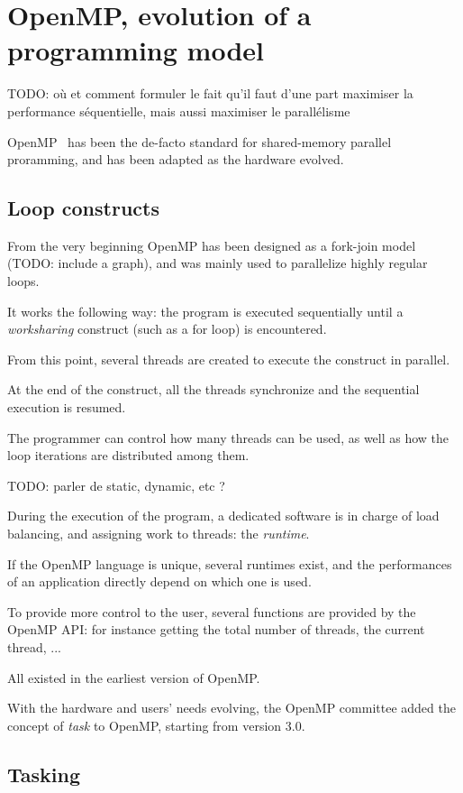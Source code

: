 \section{OpenMP, evolution of a programming model}\label{sec:context:openmp}

TODO: où et comment formuler le fait qu'il faut d'une part maximiser la performance séquentielle, mais aussi maximiser le parallélisme

OpenMP~\cite{openmp40} has been the de-facto standard for shared-memory parallel proramming, and has been adapted as the hardware evolved.

\subsection{Loop constructs}

From the very beginning OpenMP has been designed as a fork-join model (TODO: include a graph), and was mainly used to parallelize highly regular loops.

It works the following way: the program is executed sequentially until a \emph{worksharing} construct (such as a for loop) is encountered.

From this point, several threads are created to execute the construct in parallel.

At the end of the construct, all the threads synchronize and the sequential execution is resumed.

The programmer can control how many threads can be used, as well as how the loop iterations are distributed among them.

TODO: parler de static, dynamic, etc ?

During the execution of the program, a dedicated software is in charge of load balancing, and assigning work to threads: the \emph{runtime}.

If the OpenMP language is unique, several runtimes exist, and the performances of an application directly depend on which one is used.


To provide more control to the user, several functions are provided by the OpenMP API: for instance getting the total number of threads, the current thread, ...

All existed in the earliest version of OpenMP.

With the hardware and users' needs evolving, the OpenMP committee added the concept of \emph{task} to OpenMP, starting from version 3.0.


\subsection{Tasking}

